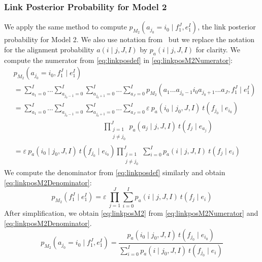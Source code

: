 \subsubsection{Link Posterior Probability for Model 2}
We apply the same method to compute $p_{M_2}(a_{j_0} = i_0 \mid f_1^J, e_1^I)$, the
link posterior probability for Model 2. We also use
notation from~\citep{brown-dellapietra-dellapietra-mercer-1993} but
we replace the notation for the alignment probability $a(i \mid j, J, I)$
by $p_a(i \mid j, J, I)$ for clarity.
We compute the numerator from \autoref{eq:linkposdef} in
\autoref{eq:linkposM2Numerator}:
%
\begin{align}
  & p_{M_2}(a_{j_0}=i_0,f_1^J \mid e_1^I) \nonumber \\
  &= \sum_{a_1 = 0}^{I} ... \sum_{a_{j_0-1} = 0}^{I} \sum_{a_{j_0+1} = 0}^{I} ... \sum_{a_J = 0}^{I} p_{M_2}(a_1 ... a_{j_0-1} i_0 a_{j_0+1} ... a_J,f_1^J \mid e_1^I) \nonumber \\
  &= \sum_{a_1 = 0}^{I} ... \sum_{a_{j_0-1} = 0}^{I} \sum_{a_{j_0+1} = 0}^{I} ... \sum_{a_J = 0}^{I} \varepsilon \ p_a(i_0 \mid j_0, J, I) \ t(f_{j_0} \mid e_{i_0}) \nonumber \\
  & \; \; \qquad \qquad \qquad \qquad \qquad \qquad \prod_{\substack{j = 1 \\ j \neq j_0}}^J p_a(a_j \mid j, J, I) \ t(f_j \mid e_{a_j}) \nonumber \\
  &= \varepsilon \ p_a(i_0 \mid j_0, J, I) \ t(f_{j_0} \mid e_{i_0}) \prod_{\substack{j = 1 \\ j \neq j_0}}^J \sum_{i=0}^I p_a(i \mid j, J, I) \ t(f_j \mid e_i) \label{eq:linkposM2Numerator}
\end{align}
%
We compute the denominator from \autoref{eq:linkposdef} similarly and obtain
\autoref{eq:linkposM2Denominator}:
%
\begin{equation} \label{eq:linkposM2Denominator}
  p_{M_2}(f_1^J \mid e_1^I) = \varepsilon \ \prod_{j=1}^J \sum_{i=0}^I p_a(i \mid j, J, I) \ t(f_j \mid e_i)
\end{equation}
%
After simplification, we obtain \autoref{eq:linkposM2} from
\autoref{eq:linkposM2Numerator} and \autoref{eq:linkposM2Denominator}.
%
\begin{equation} \label{eq:linkposM2}
  p_{M_2}(a_{j_0} = i_0 \mid f_1^J, e_1^I) = \frac{p_a(i_0 \mid j_0, J, I) \ t(f_{j_0} \mid e_{i_0})}{\sum_{i=0}^I p_a(i \mid j_0, J, I) \ t(f_{j_0} \mid e_i)}
\end{equation}
%

